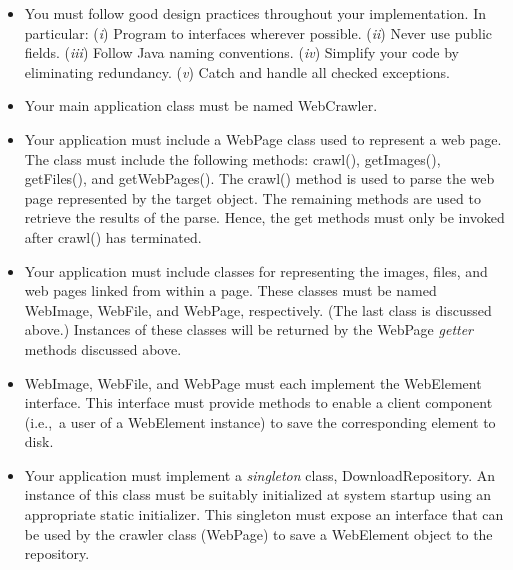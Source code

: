 \documentclass[11pt]{article}
\newcommand{\lc}[1]{{\sfs #1}}
\newcommand{\ie}{{i.e.,\ }}
\begin{document}
\begin{itemize}\itemsep 0.0in
\item You must follow good design practices throughout your implementation. 
In particular: ({\em i}) Program to interfaces wherever possible. ({\em ii}) Never 
use \lc{public} fields. ({\em iii}) Follow Java naming conventions. ({\em iv})
Simplify your code by eliminating redundancy. ({\em v}) Catch and handle all
checked exceptions.

\item Your main application class must be named \lc{WebCrawler}.

\item Your application must include a \lc{WebPage} class used to represent a
web page. The class must include the following methods: \lc{crawl()}, \lc{getImages()}, 
\lc{getFiles()}, and \lc{getWebPages()}. The \lc{crawl()} method is used to parse the 
web page represented by the target object. The remaining methods are used
to retrieve the results of the parse. Hence, the \lc{get} methods must only 
be invoked after \lc{crawl()} has terminated.

\item Your application must include classes for representing the images, files,
and web pages linked from within a page. These classes must be named
\lc{WebImage}, \lc{WebFile}, and \lc{WebPage}, respectively. (The last class is
discussed above.) Instances of these classes will be returned by the
\lc{WebPage} {\em getter} methods discussed above.

\item \lc{WebImage}, \lc{WebFile}, and \lc{WebPage} must each implement the
\lc{WebElement} interface. This interface must provide methods to enable a
client component (\ie a user of a \lc{WebElement} instance) to save the
corresponding element to disk. 

\item Your application must implement a {\em singleton} class,
\lc{DownloadRepository}. An instance of this class must be suitably initialized
at system startup using an appropriate \lc{static} initializer. This singleton
must expose an interface that can be used by the crawler class (\lc{WebPage})
to save a \lc{WebElement} object to the repository.
\end{itemize}

\end{document}
